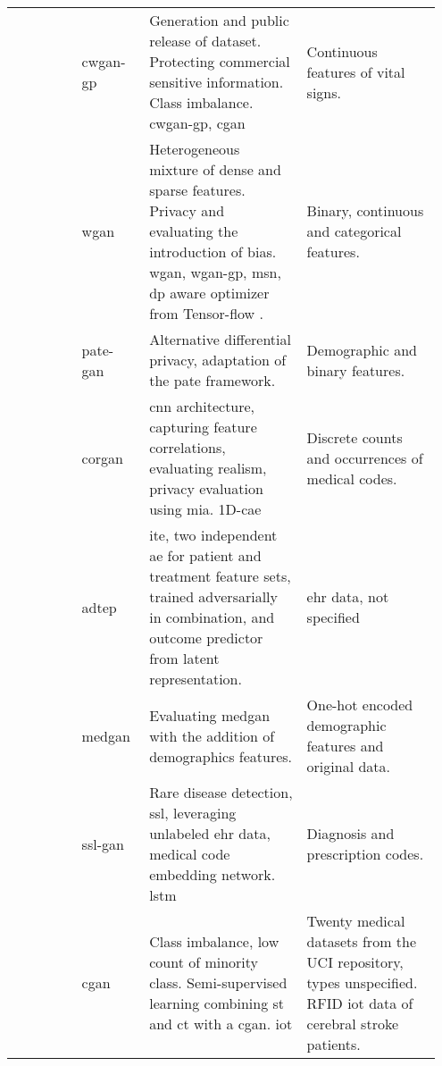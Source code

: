 \begin{landscape}
\begin{longtable}[l]{@{}p{0.15\linewidth}p{0.15\linewidth}p{0.35\linewidth}p{0.3\linewidth}@{}}
        \citeauthor{severo2019ward2icu} & \gls{cwgan-gp} 
        & Generation and public release of dataset. Protecting commercial sensitive information. Class imbalance. \gls{cwgan-gp}, \gls{cgan}
        & Continuous features of vital signs.\\
        
        \citeauthor{chin2019generation} & \gls{wgan}
        & Heterogeneous mixture of dense and sparse features. Privacy and evaluating the introduction of bias. \gls{wgan}, \gls{wgan-gp}, \gls{msn}, \gls{dp} aware optimizer from Tensor-flow \citeauthor{tensorflow-privacy}.
        & Binary, continuous and categorical features.\\
        
        \citeauthor{Jordon2019} & \gls{pate-gan}
        & Alternative differential privacy, adaptation of the  \gls{pate} framework.
        & Demographic and binary features.\\
        
        \citeauthor{torfi2019generating} & \gls{corgan}
        & \gls{cnn} architecture, capturing feature correlations, evaluating realism, privacy evaluation using \gls{mia}. 1D-\gls{cae}
        & Discrete counts and occurrences of medical codes.\\
    
        \citeauthor{chu2019treatment} & \gls{adtep}
        & \gls{ite}, two independent \gls{ae} for patient and treatment feature sets, trained adversarially in combination, and outcome predictor from latent representation. 
        & \gls{ehr} data, not specified\\
        
        \citeauthor{Jackson_2019} & \gls{medgan}
        & Evaluating medgan with the addition of demographics features.
        & One-hot encoded demographic features and original data. \\
        
        \citeauthor{yu2019rare} & \gls{ssl-gan}
        & Rare disease detection, \gls{ssl}, leveraging unlabeled \gls{ehr} data, medical code embedding network. \gls{lstm}
        & Diagnosis and prescription codes.\\
        
        \citeauthor{Yang_2019_cdss} & \gls{cgan}
        & Class imbalance, low count of minority class. Semi-supervised learning combining \gls{st} and \gls{ct} with a \gls{cgan}. \gls{iot}
        & Twenty medical datasets from the UCI repository, types unspecified. RFID \gls{iot} data of cerebral stroke patients.\\
        

\end{longtable}
\end{landscape}
